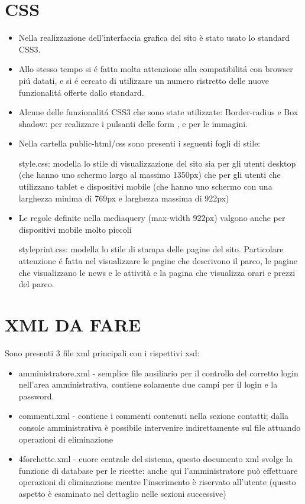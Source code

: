 \documentclass[12pt]{article}
\begin{document}
	\section{CSS}
			\begin{itemize}
				\item Nella realizzazione dell'interfaccia grafica del sito è stato usato lo standard CSS3.
				\item Allo stesso tempo si \'e fatta molta attenzione alla compatibilit\'a con browser pi\'u datati, e si \'e cercato di utilizzare un numero ristretto delle nuove funzionalit\'a offerte dallo standard.
				
				\item Alcune delle funzionalit\'a CSS3 che sono state utilizzate:
				Border-radius e Box shadow: per realizzare i pulsanti delle form , e per le immagini.
				
			
				\item Nella cartella public-html/css sono presenti i seguenti fogli di stile:

				\subitem style.css: modella lo stile di visualizzazione del sito sia per gli utenti desktop (che hanno uno schermo largo al massimo 1350px) che per gli utenti che utilizzano tablet e dispositivi mobile (che hanno uno schermo con una larghezza minima di 769px e larghezza massima di 922px) 

				\item Le regole definite nella mediaquery (max-width 922px) valgono anche per dispositivi mobile molto piccoli

				\subitem styleprint.css: modella lo stile di stampa delle pagine del sito. Particolare attenzione \'e fatta nel visualizzare le pagine che descrivono il parco, le pagine che visualizzano le news e le attività e la pagina che visualizza orari e prezzi del parco.

\end{itemize}
					\newpage
				
		\section{XML DA FARE}
		Sono presenti 3 file xml principali con i rispettivi xsd:

		\begin{itemize}
		\item  amministratore.xml - semplice file ausiliario per il controllo del corretto login nell'area amministrativa, contiene solamente due campi per il login e la password.
		
		\item commenti.xml - contiene i commenti contenuti nella sezione contatti; dalla console amministrativa è possibile intervenire indirettamente sul file attuando operazioni di eliminazione
		
		\item 4forchette.xml - cuore centrale del sistema, questo documento xml svolge la funzione di database per le ricette: anche qui l'amministratore può effettuare operazioni di eliminazione mentre l'inserimento è riservato all'utente (questo aspetto \`e esaminato nel dettaglio nelle sezioni successive)
		\end{itemize}				
					
\end{document}
